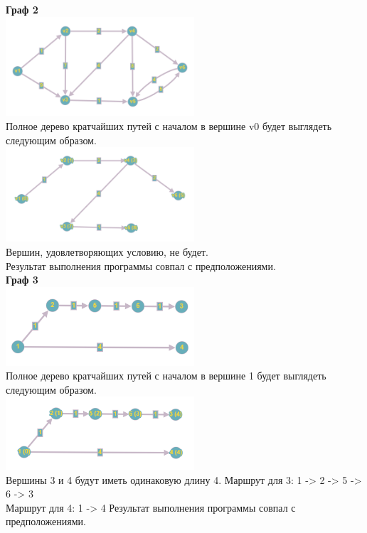 \documentclass[a4paper,14pt]{extarticle}
\begin{document}
\begin{enumerate}[1.]
        \textbf{Граф 2}\\
        \includegraphics[width=70mm]{testTree2Before}\\
        Полное дерево кратчайших путей с началом в вершине v0 будет выглядеть следующим образом.\\
        \includegraphics[width=70mm]{testTree2After}\\
        Вершин, удовлетворяющих условию, не будет.\\
        Результат выполнения программы совпал с предположениями.\\

        \textbf{Граф 3}\\
        \includegraphics[width=70mm]{testTree3Before}\\
        Полное дерево кратчайших путей с началом в вершине 1 будет выглядеть следующим образом.\\
        \includegraphics[width=70mm]{testTree3After}\\
        Вершины 3 и 4 будут иметь одинаковую длину 4.\bigbreak
        Маршрут для 3: 1 -> 2 -> 5 -> 6 -> 3\\
        Маршрут для 4: 1 -> 4\bigbreak
        Результат выполнения программы совпал с предположениями.\\


\end{enumerate}
\end{document}
